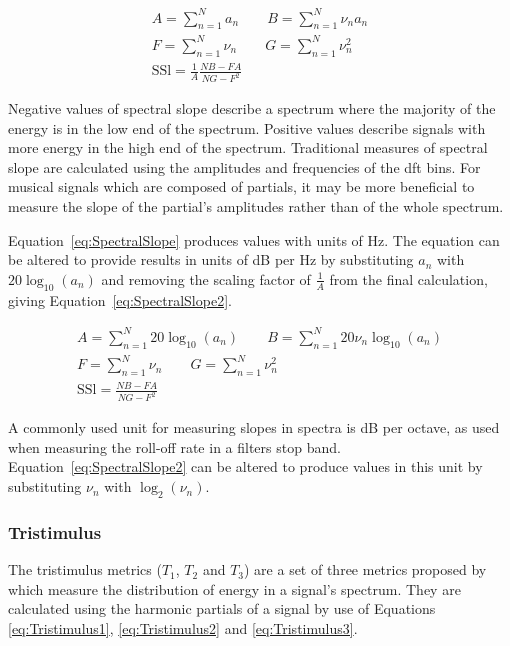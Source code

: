			\begin{gather}
				A = \sum_{n = 1}^{N} a_{n}
				\qquad 
				B = \sum_{n = 1}^{N} \nu_{n}a_{n} \nonumber \\[0.6em]
				F = \sum_{n = 1}^{N} \nu_{n} \qquad G = \sum_{n = 1}^{N} \nu_{n}^{2} \nonumber \\[0.6em]
				\mathrm{SSl} = \frac{1}{A} \frac{NB - FA}{NG - F^{2}}
				\label{eq:SpectralSlope}
			\end{gather}

			Negative values of spectral slope describe a spectrum where the majority of the energy is in the
			low end of the spectrum. Positive values describe signals with more energy in the high end of the
			spectrum. Traditional measures of spectral slope are calculated using the amplitudes and
			frequencies of the \acrshort{dft} bins. For musical signals which are composed of partials, it may
			be more beneficial to measure the slope of the partial's amplitudes rather than of the whole
			spectrum. 
			
			Equation~\ref{eq:SpectralSlope} produces values with units of Hz. The equation can be
			altered to provide results in units of dB per Hz by substituting $a_{n}$ with $20\log_{10}(a_{n})$
			and removing the scaling factor of $\frac{1}{A}$ from the final calculation, giving
			Equation~\ref{eq:SpectralSlope2}.
			
			\begin{gather}
				A = \sum_{n = 1}^{N} 20\log_{10}(a_{n})
				\qquad 
				B = \sum_{n = 1}^{N} 20\nu_{n}\log_{10}(a_{n}) \nonumber \\[0.6em]
				F = \sum_{n = 1}^{N} \nu_{n} \qquad G = \sum_{n = 1}^{N} \nu_{n}^{2} \nonumber \\[0.6em]
				\mathrm{SSl} = \frac{NB - FA}{NG - F^{2}}
				\label{eq:SpectralSlope2}
			\end{gather}
			
			A commonly used unit for measuring slopes in spectra is dB per octave, as used when measuring the
			roll-off rate in a filters stop band. Equation~\ref{eq:SpectralSlope2} can be altered to produce
			values in this unit by substituting $\nu_{n}$ with $\log_{2}(\nu_{n})$.

		\subsubsection*{Tristimulus}
			The tristimulus metrics ($T_{1}$, $T_{2}$ and $T_{3}$) are a set of three metrics proposed by
			\citet{pollard1982a} which measure the distribution of energy in a signal's spectrum. They are
			calculated using the harmonic partials of a signal by use of Equations \ref{eq:Tristimulus1},
			\ref{eq:Tristimulus2} and \ref{eq:Tristimulus3}.
			
